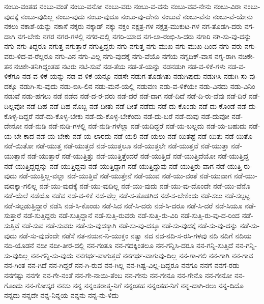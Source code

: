 {ನಂಬು-ವಂತಹ
ನಂಬು-ವಂತೆ
ನಂಬು-ವನೋ
ನಂಬು-ವರು
ನಂಬು-ವ-ವನು
ನಂಬು-ವವ-ನೇನು
ನಂಬು-ವಿರಾ
ನಂಬು-ವುದಕ್ಕೆ
ನಂಬು-ವುದಿಲ್ಲ
ನಂಬು-ವುದು
ನಂಬು-ವುದೂ
ನಂಬು-ವು-ದೇನು
ನಂಬುವೆ
ನಂಬು-ವೆನು
ನಂಬು-ವೆ-ಯೇನು
ನಕಲು
ನಕಾಶೆ-ಯನ್ನು
ನಕಾಸೆ
ನಕ್ಕರು
ನಕ್ಕಾಡ್
ನಕ್ಕು
ನಕ್ತಂ
ನಕ್ಷತ್ರ-ಗಳ
ನಕ್ಷತ್ರ-ಮುಕುಟ-ಗಳ
ನಗ-ತೊಡಗಿ-ದರು
ನಗ-ದಾಗಿ
ನಗ-ಬೇಕು
ನಗರ
ನಗರ-ಗಳಲ್ಲಿ
ನಗರ-ದಲ್ಲಿ
ನಗರಿ-ಯಾದ
ನಗ-ಲಾ-ರಂಭಿ-ಸಿ-ದರು
ನಗಾರಿ
ನಗಿ-ಸು-ವು-ದನ್ನು
ನಗು
ನಗು-ತಿದ್ದರೂ
ನಗುತ್ತ
ನಗುತ್ತಾರೆ
ನಗುತ್ತಿದ್ದರು
ನಗು-ನಗುತ್ತ
ನಗು-ಮುಖ
ನಗು-ಮುಖ-ದಿಂದ
ನಗು-ವರು
ನಗು-ವರು-ಳಿದ-ವ-ರೆಲ್ಲರೂ
ನಗು-ವಿನ
ನಗು-ವಿಲ್ಲ
ನಗು-ವುದಕ್ಕೆ
ನಗು-ವೆಯೊ
ನಗೆಯ
ನಗ್ನದಿಕ್-ವಾಸ
ನಗ್ನ-ರಾಗಿ
ನಚಿಕೇ-ತನ
ನಚಿಕೇ-ತನಿಗಿದ್ದಂತಹ
ನಟರು
ನಟಿ-ಸುವೆ
ನಡ-ತೆಯ
ನಡ-ತೆ-ಯನ್ನು
ನಡನಡುಗಿ
ನಡ-ವ-ಳಿಕೆ-ಗಳು
ನಡ-ವ-ಳಿಕೆಗೂ
ನಡ-ವ-ಳಿಕೆ-ಯನ್ನು
ನಡ-ವ-ಳಿಕೆ-ಯನ್ನೂ
ನಡಸೇ
ನಡುಗ-ತೊಡಗಿತು
ನಡುಗಿಪುದು
ನಡುಗಿಸಿ
ನಡುಗಿ-ಸು-ವು-ದಕ್ಕೂ
ನಡುಗಿ-ಸು-ವುದು
ನಡು-ಬಿಸಿ-ಲಿನ
ನಡು-ಮನೆ-ಯಲ್ಲಿ
ನಡುವಣ
ನಡು-ವ-ಳಿಕೆಯೇ
ನಡು-ವಿನದು
ನಡು-ವಿನಿಂ
ನಡುವೆ
ನಡು-ಹಗಲು
ನಡೆ
ನಡೆದ
ನಡೆ-ದ-ರ-ವರು
ನಡೆ-ದರೆ
ನಡೆ-ದಾಗ
ನಡೆ-ದಿದೆ
ನಡೆ-ದಿ-ರು-ವೆವು
ನಡೆ-ದಿರೆ
ನಡೆ-ದಿಲ್ಲವೋ
ನಡೆ-ದಿಹ
ನಡೆ-ದಿಹ-ನೊಬ್ಬ
ನಡೆ-ದೀತು
ನಡೆ-ದೀತೆ
ನಡೆದು
ನಡೆ-ದು-ಕೊಂಡು
ನಡೆ-ದು-ಕೊಂಡೆ
ನಡೆ-ದು-ಕೊಳ್ಳ-ದಿದ್ದರೆ
ನಡೆ-ದು-ಕೊಳ್ಳ-ಬೇಕು
ನಡೆ-ದು-ಕೊಳ್ಳ-ಬೇಕೆಂದು
ನಡೆ-ದು-ಬರೆ
ನಡೆ-ದುವು
ನಡೆ-ದುವೋ
ನಡೆ-ದೇನೋ
ನಡೆ-ನುಡಿ
ನಡೆ-ನುಡಿ-ಗಳಲ್ಲಿ
ನಡೆ-ನುಡಿ-ಗಳೆಲ್ಲಾ
ನಡೆ-ಯದಿದ್ದರೆ
ನಡೆ-ಯ-ಬಲ್ಲದು
ನಡೆ-ಯ-ಬಹುದು
ನಡೆ-ಯ-ಬೇ-ಕಾದ
ನಡೆ-ಯ-ಬೇಕು
ನಡೆ-ಯ-ಲಾರದು
ನಡೆ-ಯಲಿ
ನಡೆ-ಯಲು
ನಡೆ-ಯಿತಷ್ಟೆ
ನಡೆ-ಯಿತು
ನಡೆ-ಯಿತೊ
ನಡೆ-ಯಿತೋ
ನಡೆ-ಯುತ್ತ
ನಡೆ-ಯುತ್ತದೆ
ನಡೆ-ಯುತ್ತಲೂ
ನಡೆ-ಯುತ್ತಲೇ
ನಡೆ-ಯುತ್ತವೆ
ನಡೆ-ಯುತ್ತಾ
ನಡೆ-ಯುತ್ತಾನೆ
ನಡೆ-ಯುತ್ತಾರೆ
ನಡೆ-ಯುತ್ತಿತ್ತು
ನಡೆ-ಯುತ್ತಿತ್ತೆಂದರೆ
ನಡೆ-ಯುತ್ತಿದೆ
ನಡೆ-ಯುತ್ತಿದೆಯೋ
ನಡೆ-ಯುತ್ತಿದ್ದ
ನಡೆ-ಯುತ್ತಿದ್ದದ್ದನ್ನು
ನಡೆ-ಯುತ್ತಿದ್ದವು
ನಡೆ-ಯುತ್ತಿದ್ದಾಗ
ನಡೆ-ಯುತ್ತಿದ್ದುವು
ನಡೆ-ಯುತ್ತಿರು-ವಾಗ
ನಡೆ-ಯುತ್ತಿ-ರು-ವುದು
ನಡೆ-ಯುತ್ತಿಲ್ಲ-ವಲ್ಲಾ
ನಡೆ-ಯುತ್ತಿವೆ
ನಡೆ-ಯುತ್ತೇನೆ
ನಡೆ-ಯುವ
ನಡೆ-ಯು-ವಂತೆ
ನಡೆ-ಯುವಾಗ
ನಡೆ-ಯು-ವುದಕ್ಕಾ-ಗಲಿಲ್ಲ
ನಡೆ-ಯು-ವುದಕ್ಕೆ
ನಡೆ-ಯು-ವುದಿಲ್ಲ
ನಡೆ-ಯು-ವುದು
ನಡೆ-ಯು-ವು-ದೊಂದೇ
ನಡೆ-ಯು-ವೆನೊ
ನಡೆ-ಯೆಲೆ
ನಡೆಯೊ
ನಡೆವ
ನಡೆ-ವ-ಳಿಕೆ
ನಡೆ-ವೆಲ್ಲ
ನಡೆ-ಸ-ತೊಡಗಿದ
ನಡೆ-ಸ-ಬೇಕೆಂದು
ನಡೆ-ಸಲು
ನಡೆ-ಸಲ್ಪಟ್ಟ
ನಡೆ-ಸಲ್ಪಡುತ್ತಿದ್ದಾರೆ
ನಡೆಸಿ
ನಡೆ-ಸಿ-ಕೊಂಡು
ನಡೆ-ಸಿದ
ನಡೆ-ಸಿ-ದರು
ನಡೆ-ಸಿ-ದರೂ
ನಡೆ-ಸಿ-ದರೆ
ನಡೆ-ಸಿಯೂ
ನಡೆ-ಸುತ್ತಾರೆ
ನಡೆ-ಸುತ್ತಿದ್ದರು
ನಡೆ-ಸುತ್ತಿದ್ದಾನೆ
ನಡೆ-ಸುತ್ತಿ-ರುವರು
ನಡೆ-ಸುತ್ತಿ-ರು-ವಿರಿ
ನಡೆ-ಸುತ್ತಿ-ರು-ವು-ದ-ರಿಂದ
ನಡೆ-ಸುತ್ತಿವೆ
ನಡೆ-ಸುವ
ನಡೆ-ಸುವರು
ನಡೆ-ಸು-ವುದಕ್ಕಾಗಿ
ನಡೆ-ಸು-ವು-ದಕ್ಕೂ
ನಡೆ-ಸು-ವುದಕ್ಕೆ
ನಡೆ-ಸು-ವು-ದನ್ನು
ನಡೆ-ಸು-ವುದು
ನಡೆ-ಸು-ವುದೆಂದೇ
ನಡೆಸೆ
ನತ-ನಯನ-ನಿ-ಯುಕ್ತಂ
ನತ್ವಾ
ನದ
ನದ-ನದಿ-ಸ-ರಸಿ-ಗಳವು
ನದಿ
ನದಿಗೆ
ನದಿಯ
ನದಿ-ಯೊಡನೆ
ನದೀ
ನದೀ-ತೀರ-ದಲ್ಲಿ
ನನ-ಗಂತೂ
ನನ-ಗದಕ್ಕಿಂತಲೂ
ನನ-ಗನ್ನಿಸಿ-ದರೂ
ನನ-ಗನ್ನಿ-ಸುತ್ತಿದೆ
ನನ-ಗನ್ನಿ-ಸು-ವುದಿಲ್ಲ
ನನ-ಗನ್ನಿ-ಸು-ವುದು
ನನಗರ್ಥ-ವಾಗುತ್ತದೆ
ನನಗರ್ಥ-ವಾಗುವು-ದಿಲ್ಲ
ನನ-ಗಾ-ಗಲಿ
ನನ-ಗಾಗಿ
ನನ-ಗಾವ
ನನ-ಗಿಂತ
ನನ-ಗಿದೆ
ನನ-ಗಿದ್ದರೆ
ನನ-ಗಿ-ರುವ
ನನ-ಗಿಲ್ಲ
ನನ-ಗಿಷ್ಟ-ವಿಲ್ಲ-ದಿದ್ದರೂ
ನನಗೂ
ನನಗೆ
ನನಗೆ-ರಡು
ನನಗೆಷ್ಟು
ನನಗೇ
ನನ-ಗೇ-ನಂತೆ
ನನ-ಗೇ-ನಾಯಿ-ತೆಂಬ
ನನ-ಗೇನು
ನನ-ಗೇನೂ
ನನ-ಗೇನೊ
ನನ-ಗೇನೋ
ನನ-ಗೊಂದು
ನನ-ಗೋಸ್ಕರ
ನನಸು
ನನ್ನ
ನನ್ನಂತರಾತ್ಮ-ನಿಗೆ
ನನ್ನಂತಹ
ನನ್ನಂತಹ-ನಿಗೆ
ನನ್ನ-ದಾಗಿ-ರಲು
ನನ್ನ-ದಿದೊ
ನನ್ನದು
ನನ್ನದೇ
ನನ್ನ-ನಿನ್ನಯ
ನನ್ನನು
ನನ್ನ-ನು-ಳಿದು
}
